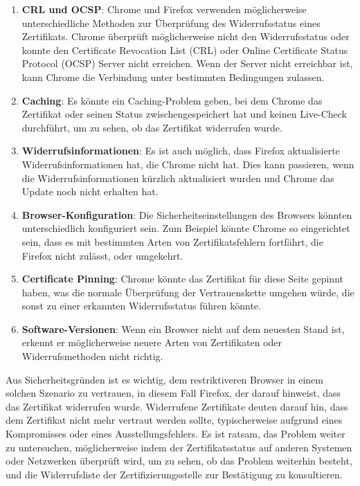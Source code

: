 \documentclass{article}
\begin{document}
\begin{enumerate}
  \item \textbf{CRL und OCSP}: Chrome und Firefox verwenden möglicherweise unterschiedliche Methoden zur Überprüfung des Widerrufsstatus eines Zertifikats. Chrome überprüft möglicherweise nicht den Widerrufsstatus oder konnte den Certificate Revocation List (CRL) oder Online Certificate Status Protocol (OCSP) Server nicht erreichen. Wenn der Server nicht erreichbar ist, kann Chrome die Verbindung unter bestimmten Bedingungen zulassen.
  \item \textbf{Caching}: Es könnte ein Caching-Problem geben, bei dem Chrome das Zertifikat oder seinen Status zwischengespeichert hat und keinen Live-Check durchführt, um zu sehen, ob das Zertifikat widerrufen wurde.
  \item \textbf{Widerrufsinformationen}: Es ist auch möglich, dass Firefox aktualisierte Widerrufsinformationen hat, die Chrome nicht hat. Dies kann passieren, wenn die Widerrufsinformationen kürzlich aktualisiert wurden und Chrome das Update noch nicht erhalten hat.
  \item \textbf{Browser-Konfiguration}: Die Sicherheitseinstellungen des Browsers könnten unterschiedlich konfiguriert sein. Zum Beispiel könnte Chrome so eingerichtet sein, dass es mit bestimmten Arten von Zertifikatsfehlern fortfährt, die Firefox nicht zulässt, oder umgekehrt.
  \item \textbf{Certificate Pinning}: Chrome könnte das Zertifikat für diese Seite gepinnt haben, was die normale Überprüfung der Vertrauenskette umgehen würde, die sonst zu einer erkannten Widerrufsstatus führen könnte.
  \item \textbf{Software-Versionen}: Wenn ein Browser nicht auf dem neuesten Stand ist, erkennt er möglicherweise neuere Arten von Zertifikaten oder Widerrufsmethoden nicht richtig.
\end{enumerate}

Aus Sicherheitsgründen ist es wichtig, dem restriktiveren Browser in einem solchen Szenario zu vertrauen, in diesem Fall Firefox, der darauf hinweist, dass das Zertifikat widerrufen wurde. Widerrufene Zertifikate deuten darauf hin, dass dem Zertifikat nicht mehr vertraut werden sollte, typischerweise aufgrund eines Kompromisses oder eines Ausstellungsfehlers. Es ist ratsam, das Problem weiter zu untersuchen, möglicherweise indem der Zertifikatsstatus auf anderen Systemen oder Netzwerken überprüft wird, um zu sehen, ob das Problem weiterhin besteht, und die Widerrufsliste der Zertifizierungsstelle zur Bestätigung zu konsultieren.
\end{document}
